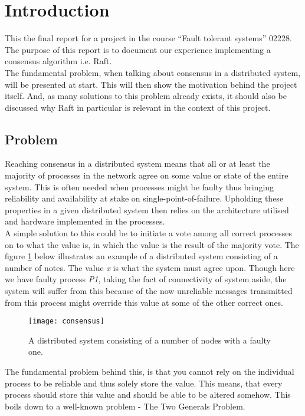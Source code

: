 \section{Introduction} %
\label{sec:introduction}

This the final report for a project in the course ``Fault tolerant systems'' 02228. The purpose of this report is to document our experience implementing a consensus algorithm i.e. Raft. \\

The fundamental problem, when talking about consensus in a distributed system, will be presented at start. This will then show the motivation behind the project itself. And, as many solutions to this problem already exists, it should also be discussed why Raft in particular is relevant in the context of this project.

\subsection{Problem}
Reaching consensus in a distributed system means that all or at least the majority of processes in the network agree on some value or state of the entire system. This is often needed when processes might be faulty thus bringing reliability and availability at stake on single-point-of-failure. Upholding these properties in a given distributed system then relies on the architecture utilised and hardware implemented in the processes.\\ A simple solution to this could be to initiate a vote among all correct processes on to what the value is, in which the value is the result of the majority vote. The figure \ref{consensus} below illustrates an example of a distributed system consisting of a number of notes. The value \textit{x} is what the system must agree upon. Though here we have faulty process \textit{P1}, taking the fact of connectivity of system aside, the system will suffer from this because of the now unreliable messages transmitted from this process might override this value at some of the other correct ones. \\

\begin{figure}[h]
	\centering
	\texttt{[image: consensus]}
	\caption{A distributed system consisting of a number of nodes with a faulty one.}
	\label{consensus}
\end{figure}

The fundamental problem behind this, is that you cannot rely on the individual process to be reliable and thus solely store the value. This means, that every process should store this value and should be able to be altered somehow. This boils down to a well-known problem - The Two Generals Problem.

